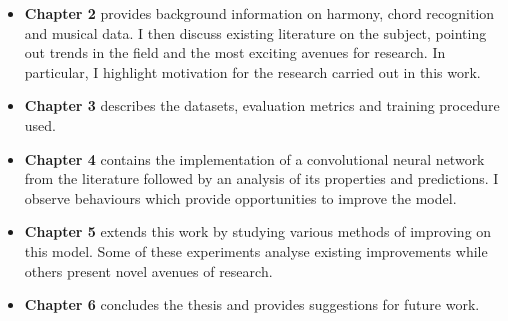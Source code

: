 \begin{itemize}
    \item \textbf{Chapter 2} provides background information on harmony, chord recognition and musical data. I then discuss existing literature on the subject, pointing out trends in the field and the most exciting avenues for research. In particular, I highlight motivation for the research carried out in this work.
    \item \textbf{Chapter 3} describes the datasets, evaluation metrics and training procedure used.
    \item \textbf{Chapter 4} contains the implementation of a convolutional neural network from the literature followed by an analysis of its properties and predictions. I observe behaviours which provide opportunities to improve the model. 
    \item \textbf{Chapter 5} extends this work by studying various methods of improving on this model. Some of these experiments analyse existing improvements while others present novel avenues of research.
    \item \textbf{Chapter 6} concludes the thesis and provides suggestions for future work.
\end{itemize}